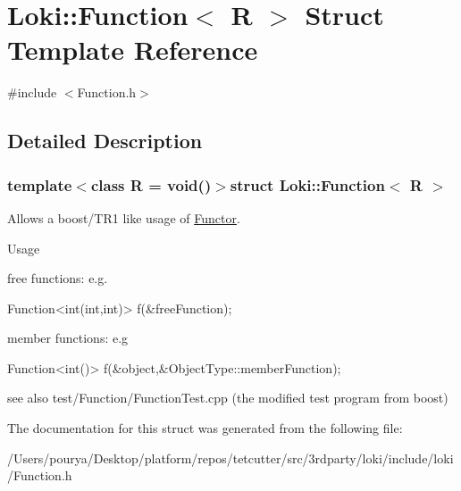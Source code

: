 \hypertarget{structLoki_1_1Function}{}\section{Loki\+:\+:Function$<$ R $>$ Struct Template Reference}
\label{structLoki_1_1Function}


{\ttfamily \#include $<$Function.\+h$>$}



\subsection{Detailed Description}
\subsubsection*{template$<$class R = void()$>$struct Loki\+::\+Function$<$ R $>$}

Allows a boost/\+T\+R1 like usage of \hyperlink{classLoki_1_1Functor}{Functor}.

\begin{DoxyParagraph}{Usage}

\end{DoxyParagraph}

\begin{DoxyItemize}
\item free functions\+: e.\+g.
\begin{DoxyCode}
Function<int(int,int)> f(&freeFunction);
\end{DoxyCode}

\item member functions\+: e.\+g
\begin{DoxyCode}
Function<int()> f(&\textcolor{keywordtype}{object},&ObjectType::memberFunction); 
\end{DoxyCode}

\end{DoxyItemize}

see also test/\+Function/\+Function\+Test.\+cpp (the modified test program from boost) 

The documentation for this struct was generated from the following file\+:\begin{DoxyCompactItemize}
\item 
/\+Users/pourya/\+Desktop/platform/repos/tetcutter/src/3rdparty/loki/include/loki/Function.\+h\end{DoxyCompactItemize}
